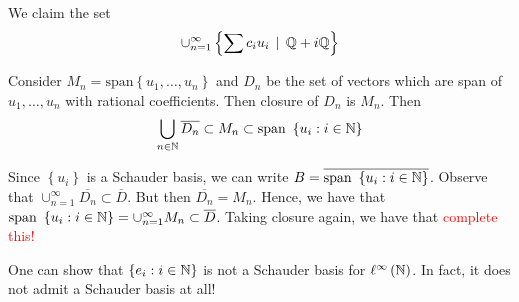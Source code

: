 We claim the set
\begin{equation*}
    \cup_{n=1}^{\infty} \left\{ \sum c_{i} u_{i} \, \mid \, \mathbb Q + i \mathbb Q \right\}
\end{equation*}

Consider $M_n = \text{span} \left\{ u_{1}, \ldots , u_{n} \right\}$ and $D_{n}$ be the set of vectors which are span of $u_{1}, \ldots , u_{n}$ with rational coefficients. Then closure of $D_{n}$ is $M_n$. Then 
\begin{align*}
    \bigcup_{n\in \mathbb N} \overline{D_{n}} \subset M_{n} \subset \text{span } \left\{ u_{i} : i \in \mathbb N \right\}
\end{align*}
 
Since $\left\{ u_{i} \right\}$ is a Schauder basis, we can write $B= \overline {\text{span } \left\{ u_{i} : i \in \mathbb N \right\}}$. Observe that $\cup_{n=1}^{\infty} \overline{D_{n}} \subset \overline {D}$. But then $\overline {D_{n}} = M_{n}$. Hence, we have that $\text{span } \left\{ u_{i} : i \in \mathbb N \right\} = \cup_{n=1}^{\infty} M_{n} \subset \overline {D}$. Taking closure again, we have that  \textcolor{red}{complete this!}


\horz

One can show that $\left\{ e_{i} : i\in \mathbb N \right\}$ is not a Schauder basis for $\ell ^{\infty} \left( \mathbb N \right) $. In fact, it does not admit a Schauder basis at all!
